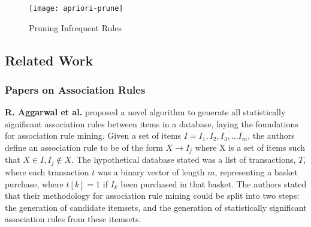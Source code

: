 \documentclass[a4paper,11pt]{article}
\begin{document}
\begin{figure}[H]\centering
\texttt{[image: apriori-prune]}
\caption{Pruning Infrequent Rules}
\label{fig:prune}
\end{figure}

\subsection{Related Work}
\label{related-work}
\subsubsection{Papers on Association Rules}
\textbf{R. Aggarwal et al.} \cite{mine} proposed a novel algorithm to generate all statistically significant association rules between items in a database, laying the foundations for association rule mining.  Given a set of items $I = I_1, I_2, I_3,...I_m$, the authors define an association rule to be of the form $X \rightarrow I_j$ where X is a set of items such that $X \in I, I_j \notin X$.  The hypothetical database stated was a list of transactions, $T$, where each transaction $t$ was a binary vector of length $m$, representing a basket purchase, where $t[k] = 1$ if $I_k$ been purchased in that basket.  The authors stated that their methodology for association rule mining could be split into two steps: the generation of candidate itemsets, and the generation of statistically significant association rules from these itemsets. \\
\end{document}
